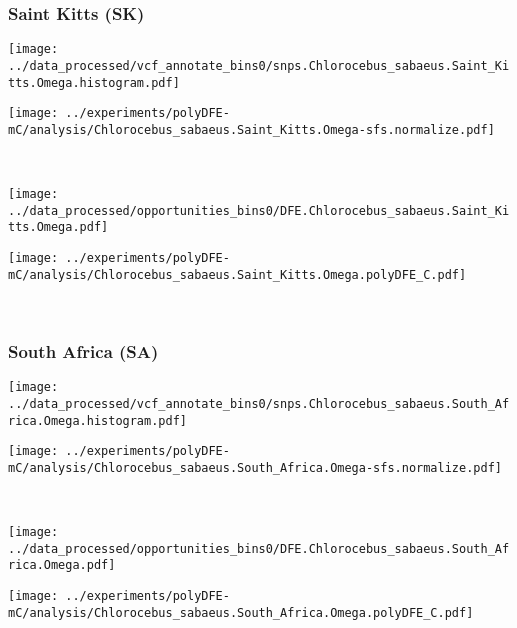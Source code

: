 \subsubsection{Saint Kitts (SK)}

\begin{minipage}{0.49\linewidth}
    \texttt{[image: ../data\_processed/vcf\_annotate\_bins0/snps.Chlorocebus\_sabaeus.Saint\_Kitts.Omega.histogram.pdf]}
\end{minipage}
\begin{minipage}{0.49\linewidth}
    \texttt{[image: ../experiments/polyDFE-mC/analysis/Chlorocebus\_sabaeus.Saint\_Kitts.Omega-sfs.normalize.pdf]}
\end{minipage}
\\
\begin{minipage}{0.49\linewidth}
    \texttt{[image: ../data\_processed/opportunities\_bins0/DFE.Chlorocebus\_sabaeus.Saint\_Kitts.Omega.pdf]}
\end{minipage}
\begin{minipage}{0.49\linewidth}
    \texttt{[image: ../experiments/polyDFE-mC/analysis/Chlorocebus\_sabaeus.Saint\_Kitts.Omega.polyDFE\_C.pdf]}
\end{minipage}
\\

\subsubsection{South Africa (SA)}

\begin{minipage}{0.49\linewidth}
    \texttt{[image: ../data\_processed/vcf\_annotate\_bins0/snps.Chlorocebus\_sabaeus.South\_Africa.Omega.histogram.pdf]}
\end{minipage}
\begin{minipage}{0.49\linewidth}
    \texttt{[image: ../experiments/polyDFE-mC/analysis/Chlorocebus\_sabaeus.South\_Africa.Omega-sfs.normalize.pdf]}
\end{minipage}
\\
\begin{minipage}{0.49\linewidth}
    \texttt{[image: ../data\_processed/opportunities\_bins0/DFE.Chlorocebus\_sabaeus.South\_Africa.Omega.pdf]}
\end{minipage}
\begin{minipage}{0.49\linewidth}
    \texttt{[image: ../experiments/polyDFE-mC/analysis/Chlorocebus\_sabaeus.South\_Africa.Omega.polyDFE\_C.pdf]}
\end{minipage}
\\

